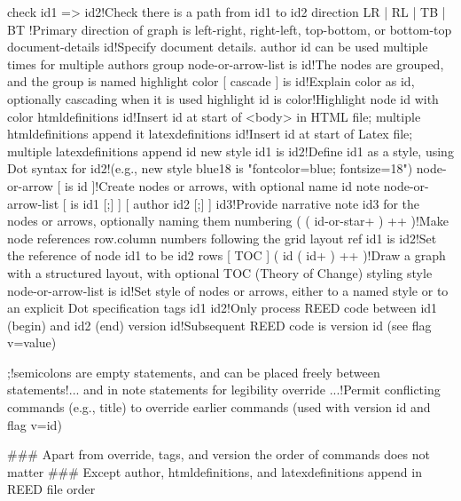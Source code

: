 check id1 => id2!Check there is a path from id1 to id2
direction { LR | RL | TB | BT }!Primary direction of graph is left-right, right-left, top-bottom, or bottom-top
document-details id!Specify document details. author id can be used multiple times for multiple authors
group node-or-arrow-list is id!The nodes are grouped, and the group is named
highlight color [ cascade ] is id!Explain color as id, optionally cascading when it is used
highlight id is color!Highlight node id with color
htmldefinitions id!Insert id at start of <body> in HTML file; multiple htmldefinitions append it
latexdefinitions id!Insert id at start of Latex file; multiple latexdefinitions append id 
new style id1 is id2!Define id1 as a style, using Dot syntax for id2!(e.g., new style blue18 is "fontcolor=blue; fontsize=18")
node-or-arrow [ is id ]!Create nodes or arrows, with optional name id
note node-or-arrow-list [ is id1 [;] ] [ author id2 [;] ] id3!Provide narrative note id3 for the nodes or arrows, optionally naming them
numbering ( { ( id-or-star+ ) }++ )!Make node references row.column numbers following the grid layout
ref id1 is id2!Set the reference of node id1 to be id2
rows [ TOC ] ( { id ( id+ ) }++ )!Draw a graph with a structured layout, with optional TOC (Theory of Change) styling
style node-or-arrow-list is id!Set style of nodes or arrows, either to a named style or to an explicit Dot specification
tags id1 id2!Only process REED code between id1 (begin) and id2 (end)
version id!Subsequent REED code is version id (see flag v=value)

;!semicolons are empty statements, and can be placed freely between statements!... and in note statements for legibility
override ...!Permit conflicting commands (e.g., title) to override earlier commands (used with version id and flag v=id)

### Apart from override, tags, and version the order of commands does not matter
### Except author, htmldefinitions, and latexdefinitions append in REED file order

